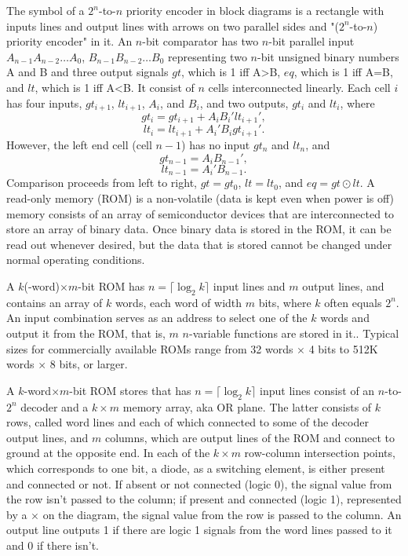 \documentclass[a4paper,12pt]{report}
\begin{document}
The symbol of a $2^n$-to-$n$ priority encoder in block diagrams is a rectangle with inputs lines and output lines with arrows on two parallel sides and "($2^n$-to-$n$) priority encoder" in it.
An $n$-bit comparator has two $n$-bit parallel input $A_{n-1}A_{n-2}\ldots A_0$, $B_{n-1}B_{n-2}\ldots B_0$ representing two $n$-bit unsigned binary numbers A and B and three output signals $gt$, which is 1 iff A>B, $eq$, which is 1 iff A=B, and $lt$, which is 1 iff A<B. It consist of $n$ cells interconnected linearly. Each cell $i$ has four inputs, $gt_{i+1}$, $lt_{i+1}$, $A_i$, and  $B_i$, and two outputs, $gt_i$ and $lt_i$, where
\[gt_i=gt_{i+1}+A_iB_i'lt_{i+1}',\]
\[lt_i=lt_{i+1}+A_i'B_igt_{i+1}'.\]
However, the left end cell (cell $n-1$) has no input $gt_n$ and $lt_n$, and
\[gt_{n-1}=A_iB_{n-1}',\]
\[lt_{n-1}=A_i'B_{n-1}.\]
Comparison proceeds from left to right, $gt=gt_0$, $lt=lt_0$, and $eq=gt\odot lt$.
A read-only memory (ROM) is a non-volatile (data is kept even when power is off) memory consists of an array of semiconductor devices that are interconnected to store an array of binary data. Once binary data is stored in the ROM, it can be read out whenever desired, but the data that is stored cannot be changed under normal operating conditions.

A $k$(-word)$\times m$-bit ROM has $n=\lceil\log_2k\rceil$ input lines and $m$ output lines, and contains an array of $k$ words, each word of width $m$ bits, where $k$ often equals $2^n$. An input combination serves as an address to select one of the $k$ words and output it from the ROM, that is, $m$ $n$-variable functions are stored in it.. Typical sizes for commercially available ROMs range from 32 words $\times$ 4 bits to 512K words $\times$ 8 bits, or larger.

A $k$-word$\times m$-bit ROM stores that has $n=\lceil\log_2k\rceil$ input lines consist of an $n$-to-$2^n$ decoder and a $k\times m$ memory array, aka OR plane. The latter consists of $k$ rows, called word lines and each of which connected to some of the decoder output lines, and $m$ columns, which are output lines of the ROM and connect to ground at the opposite end. In each of the $k\times m$ row-column intersection points, which corresponds to one bit, a diode, as a switching element, is either present and connected or not. If absent or not connected (logic 0), the signal value from the row isn't passed to the column; if present and connected (logic 1), represented by a $\times$ on the diagram, the signal value from the row is passed to the column. An output line outputs 1 if there are logic 1 signals from the word lines passed to it and 0 if there isn't.
\end{document}

